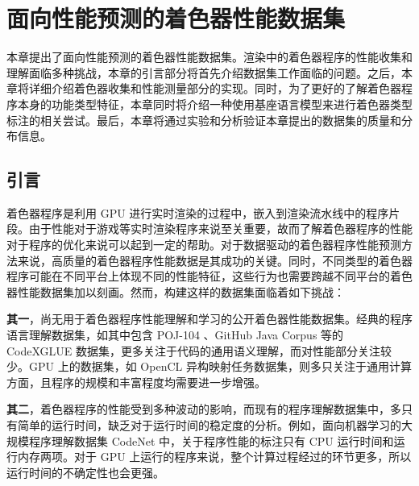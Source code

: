 
\chapter{面向性能预测的着色器性能数据集}

{\added 本章提出了面向性能预测的着色器性能数据集。渲染中的着色器程序的性能收集和理解面临多种挑战，本章的引言部分将首先介绍数据集工作面临的问题。之后，本章将详细介绍着色器收集和性能测量部分的实现。同时，为了更好的了解着色器程序本身的功能类型特征，本章同时将介绍一种使用基座语言模型来进行着色器类型标注的相关尝试。最后，本章将通过实验和分析验证本章提出的数据集的质量和分布信息。}

\section{引言}

{\amend 着色器程序是利用 GPU 进行实时渲染的过程中，嵌入到渲染流水线中的程序片段。由于性能对于游戏等实时渲染程序来说至关重要，故而了解着色器程序的性能对于程序的优化来说可以起到一定的帮助。对于数据驱动的着色器程序性能预测方法来说，高质量的着色器程序性能数据是其成功的关键。同时，不同类型的着色器程序可能在不同平台上体现不同的性能特征，这些行为也需要跨越不同平台的着色器性能数据集加以刻画。然而，构建这样的数据集面临着如下挑战：

{\bf 其一}，尚无用于着色器程序性能理解和学习的公开着色器性能数据集。经典的程序语言理解数据集，如其中包含 POJ-104 \cite{10.5555/3015812.3016002}、GitHub Java Corpus 等的 CodeXGLUE 数据集\cite{DBLP:journals/corr/abs-2102-04664}，更多关注于代码的通用语义理解，而对性能部分关注较少。GPU 上的数据集，如 OpenCL 异构映射任务数据集\cite{8091247}，则多只关注于通用计算方面，且程序的规模和丰富程度均需要进一步增强。

{\bf 其二}，着色器程序的性能受到多种波动的影响，而现有的程序理解数据集中，多只有简单的运行时间，缺乏对于运行时间的稳定度的分析。例如，面向机器学习的大规模程序理解数据集 CodeNet \cite{DBLP:journals/corr/abs-2105-12655} 中，关于程序性能的标注只有 CPU 运行时间和运行内存两项。对于 GPU 上运行的程序来说，整个计算过程经过的环节更多，所以运行时间的不确定性也会更强。}

